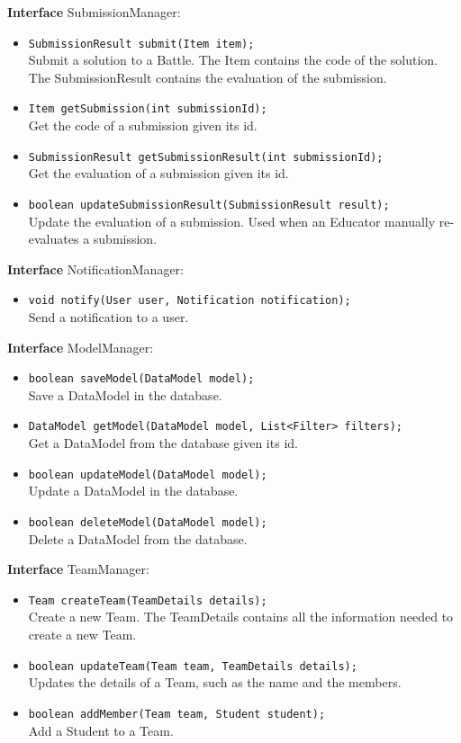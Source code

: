 \textbf{Interface} SubmissionManager:
\begin{itemize}
    \item \texttt{SubmissionResult submit(Item item);}
    \\ Submit a solution to a Battle. The Item contains the code of the solution. The SubmissionResult contains the evaluation of the submission.
    \item \texttt{Item getSubmission(int submissionId);}
    \\ Get the code of a submission given its id.
    \item \texttt{SubmissionResult getSubmissionResult(int submissionId);}
    \\ Get the evaluation of a submission given its id.
    \item \texttt{boolean updateSubmissionResult(SubmissionResult result);}
    \\ Update the evaluation of a submission. Used when an Educator manually re-evaluates a submission.
\end{itemize}

\textbf{Interface} NotificationManager:
\begin{itemize}
    \item \texttt{void notify(User user, Notification notification);}
    \\ Send a notification to a user.
\end{itemize}

\textbf{Interface} ModelManager:
\begin{itemize}
    \item \texttt{boolean saveModel(DataModel model);}
    \\ Save a DataModel in the database.
    \item \texttt{DataModel getModel(DataModel model, List<Filter> filters);}
    \\ Get a DataModel from the database given its id.
    \item \texttt{boolean updateModel(DataModel model);}
    \\ Update a DataModel in the database.
    \item \texttt{boolean deleteModel(DataModel model);}
    \\ Delete a DataModel from the database.
\end{itemize}

\textbf{Interface} TeamManager:
\begin{itemize}
    \item \texttt{Team createTeam(TeamDetails details);}
    \\ Create a new Team. The TeamDetails contains all the information needed to create a new Team.
    \item \texttt{boolean updateTeam(Team team, TeamDetails details);}
    \\ Updates the details of a Team, such as the name and the members.
    \item \texttt{boolean addMember(Team team, Student student);}
    \\ Add a Student to a Team.
\end{itemize}


